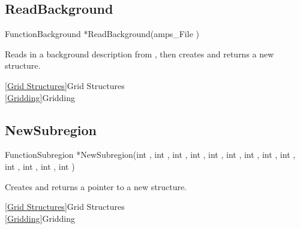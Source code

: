 
\newpage
\subsection{ReadBackground}
\label{ReadBackground}


\begin{deftypefn}{Function}{Background *}{ReadBackground}(amps_File )

\DESCRIPTION
Reads in a background description from , then
creates and returns a new  structure.

\SEEALSO
\vref{Grid Structures}{Grid Structures}\\
\vref{Gridding}{Gridding}

\end{deftypefn}


\newpage
\subsection{NewSubregion}
\label{NewSubregion}


\begin{deftypefn}{Function}{Subregion *}{NewSubregion}(int , int , int , int , int , int , int , int , int , int , int , int , int )

\DESCRIPTION
Creates and returns a pointer to a new  structure.

\SEEALSO
\vref{Grid Structures}{Grid Structures}\\
\vref{Gridding}{Gridding}

\end{deftypefn}



